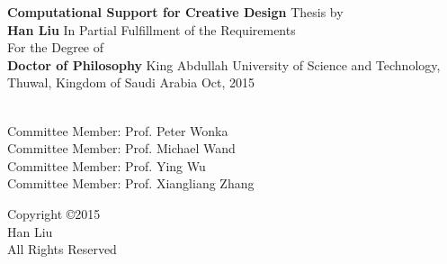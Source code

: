 \documentclass[onecolumn, 12 pt, doublespace, fullpage, letterpaper]{report}
\begin{document}

\vspace{2pt}
\thispagestyle{empty}
\addvspace{10mm}

\begin{center}
{\bf\Large Computational Support for Creative Design}\vfill
{\Large Thesis by}\\
{\bf\Large Han Liu}\vfill
{\Large In Partial Fulfillment of the Requirements}\\[12pt]
{\Large For the Degree of}\\[12pt]
{\bf\Large Doctor of Philosophy}\vfill
{King Abdullah University of Science and Technology, }\\
{Thuwal, Kingdom of Saudi Arabia}
\vfill
{Oct, 2015}\vfill

\end{center}

\newpage
{}

\vspace{6\baselineskip}

\\
Committee Member: Prof. Peter Wonka\\
Committee Member: Prof. Michael Wand\\
Committee Member: Prof. Ying Wu\\
Committee Member: Prof. Xiangliang Zhang\vfill


\newpage
{}
\vspace*{\fill}
\begin{center}
{Copyright \copyright 2015}\\
{Han Liu}\\
{All Rights Reserved}
\end{center}




\end{document}
